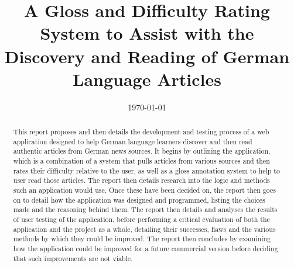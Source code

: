 \documentclass{ecsreport}
\begin{document}
\frontmatter
\title      {A Gloss and Difficulty Rating System to Assist with the Discovery and Reading of German Language Articles}
\addresses  {\groupname\\\deptname\\\univname}
\date       {\today}
\subject    {}
\keywords   {}
\maketitle
\begin{abstract} %
	
This report proposes and then details the development and testing process of a web application designed to help German language learners discover and then read authentic articles from German news sources. It begins by outlining the application, which is a combination of a system that pulls articles from various sources and then rates their difficulty relative to the user, as well as a gloss annotation system to help to user read those articles. The report then details research into the logic and methods such an application would use. Once these have been decided on, the report then goes on to detail how the application was designed and programmed, listing the choices made and the reasoning behind them. The report then details and analyses the results of user testing of the application, before performing a critical evaluation of both the application and the project as a whole, detailing their successes, flaws and the various methods by which they could be improved. The report then concludes by examining how the application could be improved for a future commercial version before deciding that such improvements are not viable.	 
	
\end{abstract}
\tableofcontents
\listoffigures
\listoftables
\lstlistoflistings
\mainmatter
\appendix




\backmatter
%
%
\printbibliography
\end{document}
